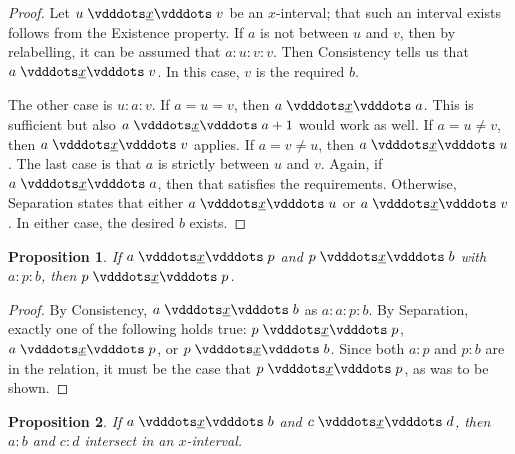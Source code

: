 \documentclass[12pt]{article}
\newtheorem{proposition}{Proposition}[section]
\begin{document}
\begin{proof}
    Let $u \xrel v$ be an $x$-interval; that such an interval exists follows from the Existence property. If $a$ is not between $u$ and $v$, then by relabelling, it can be assumed that $a:u:v:v$. Then Consistency tells us that $a \xrel v$. In this case, $v$ is the required $b$. 

    The other case is $u:a:v$. If $a = u = v$, then $a \xrel a$. This is sufficient but also $a \xrel a+1$ would work as well. If $a = u \neq v$, then $a \xrel v$ applies. If $a  = v \neq u$, then $a \xrel u$. The last case is that $a$ is strictly between $u$ and $v$. Again, if $a \xrel a$, then that satisfies the requirements. Otherwise, Separation states that either $a \xrel u$ or $a \xrel v$. In either case, the desired $b$ exists. 
\end{proof}


\begin{proposition}\label{br:endpointed}
    If $a \xrel p$ and $p \xrel b$ with $a:p:b$, then $p \xrel p$.
\end{proposition}

\begin{proof}
    By Consistency, $a \xrel b$ as $a:a:p:b$.  By Separation, exactly one of the following holds true: $p \xrel p$,  \sout{$a \xrel p$}, or \sout{$p \xrel b$}. Since both $a:p$ and $p:b$ are in the relation, it must be the case that $p \xrel p$, as was to be shown. 
\end{proof}


\begin{proposition}\label{br:intersect}
    If $a \xrel b$ and $c \xrel d$, then $a:b$ and $c:d$ intersect in an $x$-interval. 
\end{proposition}
\end{document}
